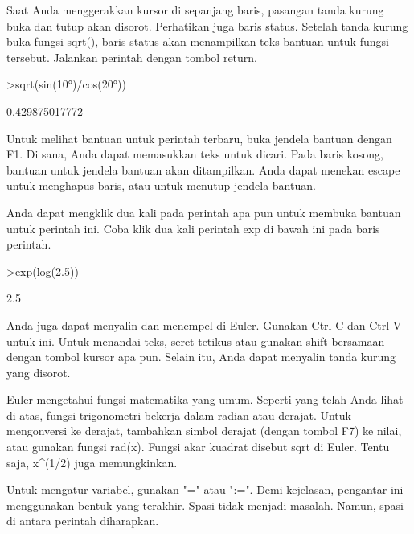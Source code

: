 \documentclass[a4paper,10pt]{article}
\begin{document}
\begin{eulernotebook}
\begin{eulercomment}
\begin{eulercomment}
\begin{eulercomment}
Saat Anda menggerakkan kursor di sepanjang baris, pasangan tanda
kurung buka dan tutup akan disorot. Perhatikan juga baris status.
Setelah tanda kurung buka fungsi sqrt(), baris status akan menampilkan
teks bantuan untuk fungsi tersebut. Jalankan perintah dengan tombol
return.
\end{eulercomment}
\begin{eulerprompt}
>sqrt(sin(10°)/cos(20°))
\end{eulerprompt}
\begin{euleroutput}
  0.429875017772
\end{euleroutput}
\begin{eulercomment}
Untuk melihat bantuan untuk perintah terbaru, buka jendela bantuan
dengan F1. Di sana, Anda dapat memasukkan teks untuk dicari. Pada
baris kosong, bantuan untuk jendela bantuan akan ditampilkan. Anda
dapat menekan escape untuk menghapus baris, atau untuk menutup jendela
bantuan.

Anda dapat mengklik dua kali pada perintah apa pun untuk membuka
bantuan untuk perintah ini. Coba klik dua kali perintah exp di bawah
ini pada baris perintah.
\end{eulercomment}
\begin{eulerprompt}
>exp(log(2.5))
\end{eulerprompt}
\begin{euleroutput}
  2.5
\end{euleroutput}
\begin{eulercomment}
Anda juga dapat menyalin dan menempel di Euler. Gunakan Ctrl-C dan
Ctrl-V untuk ini. Untuk menandai teks, seret tetikus atau gunakan
shift bersamaan dengan tombol kursor apa pun. Selain itu, Anda dapat
menyalin tanda kurung yang disorot.
\end{eulercomment}
\begin{eulercomment}

\end{eulercomment}
\begin{eulercomment}
Euler mengetahui fungsi matematika yang umum. Seperti yang telah Anda
lihat di atas, fungsi trigonometri bekerja dalam radian atau derajat.
Untuk mengonversi ke derajat, tambahkan simbol derajat (dengan tombol
F7) ke nilai, atau gunakan fungsi rad(x). Fungsi akar kuadrat disebut
sqrt di Euler. Tentu saja, x\textasciicircum{}(1/2) juga memungkinkan.

Untuk mengatur variabel, gunakan "=" atau ":=". Demi kejelasan,
pengantar ini menggunakan bentuk yang terakhir. Spasi tidak menjadi
masalah. Namun, spasi di antara perintah diharapkan.


\end{eulercomment}
\end{eulercomment}
\end{eulercomment}
\end{eulernotebook}
\end{document}
